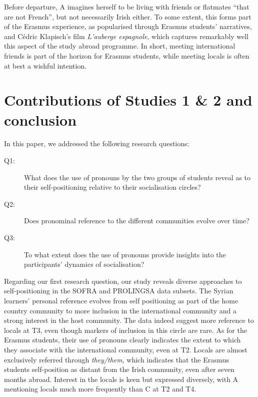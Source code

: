 \documentclass[output=paper]{langscibook}
\begin{document}
Before departure, A imagines herself to be living with friends or flatmates “that are not French”, but not necessarily Irish either. To some extent, this forms part of the Erasmus experience, as popularised through Erasmus students’ narratives, and Cédric Klapisch’s film \textit{L’auberge espagnole}, which captures remarkably well this aspect of the study abroad programme. In short, meeting international friends is part of the horizon for Erasmus students, while meeting locals is often at best a wishful intention.

\section{Contributions of Studies 1 \& 2 and conclusion} \label{sec:saddour:4}

In this paper, we addressed the following research questions:

\begin{description}
\item[Q1:] What does the use of pronouns by the two groups of students reveal as to their self-positioning relative to their socialisation circles?
\item[Q2:] Does pronominal reference to the different communities evolve over time?
\item[Q3:] To what extent does the use of pronouns provide insights into the participants’ dynamics of socialisation?
\end{description}

Regarding our first research question, our study reveals diverse approaches to self-positioning in the SOFRA and PROLINGSA data subsets. The Syrian learners’ personal reference evolves from self positioning as part of the home country community to more inclusion in the international community and a strong interest in the host community. The data indeed suggest more reference to locals at T3, even though markers of inclusion in this circle are rare. As for the Erasmus students, their use of pronouns clearly indicates the extent to which they associate with the international community, even at T2. Locals are almost exclusively referred through \textit{they/them}, which indicates that the Erasmus students self-position as distant from the Irish community, even after seven months abroad. Interest in the locals is keen but expressed diversely, with A mentioning locals much more frequently than C at T2 and T4.
\end{document}
